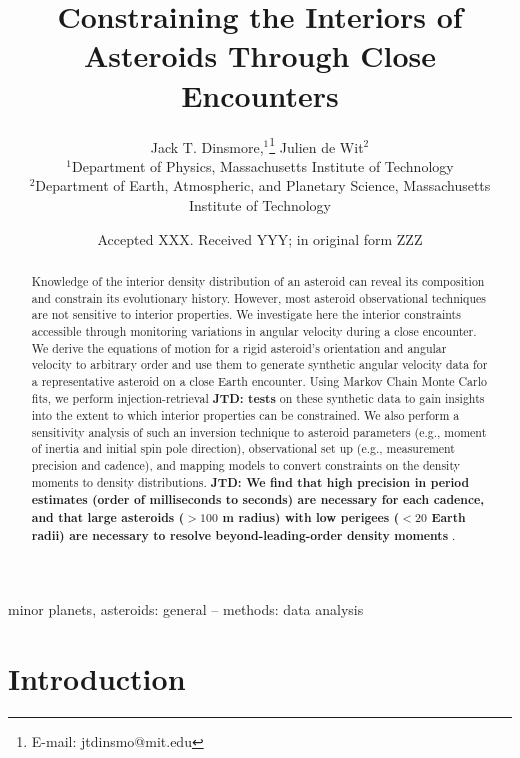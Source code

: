 \documentclass[fleqn,usenatbib]{mnras}
\title[Flyby Constraints on Asteroids Interiors]{Constraining the Interiors of Asteroids Through Close Encounters}
\author[Jack T. Dinsmore, Julien de Wit]{
Jack T. Dinsmore,$^{1}$\thanks{E-mail: jtdinsmo@mit.edu}
Julien de Wit$^{2}$
\\
$^{1}$Department of Physics, Massachusetts Institute of Technology\\
$^{2}$Department of Earth, Atmospheric, and Planetary Science, Massachusetts Institute of Technology
}
\date{Accepted XXX. Received YYY; in original form ZZZ}
\newcommand{\jtd}[1]{ {\bf{\color{red} JTD: #1}} }
\begin{document}
\label{firstpage}
\pagerange{\pageref{firstpage}--\pageref{lastpage}}
\maketitle

\begin{abstract}
  Knowledge of the interior density distribution of an asteroid can reveal its composition and constrain its evolutionary history. However, most asteroid observational techniques are not sensitive to interior properties. We investigate here the interior constraints accessible through monitoring variations in angular velocity during a close encounter. We derive the equations of motion for a rigid asteroid's orientation and angular velocity to arbitrary order and use them to generate synthetic angular velocity data for a representative asteroid on a close Earth encounter. Using Markov Chain Monte Carlo fits, we perform injection-retrieval \jtd{tests} on these synthetic data to gain insights into the extent to which interior properties can be constrained. We also perform a sensitivity analysis of such an inversion technique to asteroid parameters (e.g., moment of inertia and initial spin pole direction), observational set up (e.g., measurement precision and cadence), and mapping models to convert constraints on the density moments to density distributions. \jtd{We find that high precision in period estimates (order of milliseconds to seconds) are necessary for each cadence, and that large asteroids ($> 100$ m radius) with low perigees ($<20$ Earth radii) are necessary to resolve beyond-leading-order density moments}.
\end{abstract}

\begin{keywords}
  minor planets, asteroids: general -- methods: data analysis
\end{keywords}



\section{Introduction}
\end{document}
